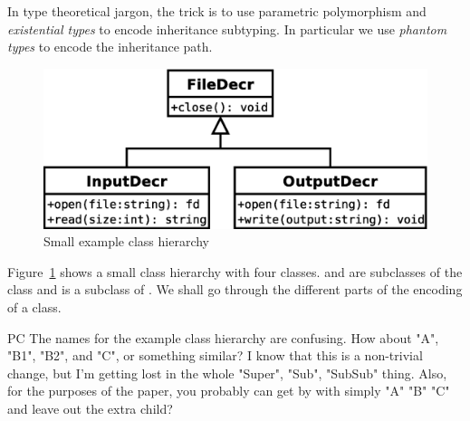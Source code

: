 \documentclass[workingdraft]{usetex-v1}
\begin{document}
In type theoretical jargon, the trick is to use parametric
polymorphism and \emph{existential types} to encode inheritance
subtyping.  In particular we use \emph{phantom types} to encode the
inheritance path.


\begin{figure}[htp]
  \centering
  \includegraphics[width=.8\linewidth]{filedecr-class-diagram.eps}
  \caption{Small example class hierarchy}
  \label{fig:class-hierarchy}
\end{figure}

Figure~\ref{fig:class-hierarchy} shows a small class hierarchy with
four classes.  and 
are subclasses of the class  and
 is a subclass of .  We
shall go through the different parts of the encoding of a class.

\begin{ednote}{PC}
    The names for the example class hierarchy are confusing.
  How about "A", "B1", "B2", and "C", or something similar?
  I know that this is a non-trivial change, but I'm getting
  lost in the whole "Super", "Sub", "SubSub" thing.  Also, for
  the purposes of the paper, you probably can get by with
  simply "A" "B" "C" and leave out the extra child?
\end{ednote}
\end{document}
